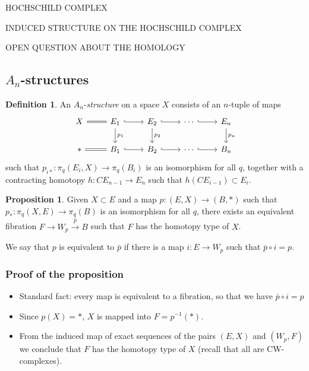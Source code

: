 \documentclass{beamer}
\theoremstyle{definition}
\newtheorem{defi}{Definition}
\newtheorem{prop}[teorema]{Proposition}
\begin{document}
\begin{frame}
HOCHSCHILD COMPLEX
	
\end{frame}

\begin{frame}
INDUCED STRUCTURE ON THE HOCHSCHILD COMPLEX
\end{frame}

\begin{frame}
OPEN QUESTION ABOUT THE HOMOLOGY
\end{frame}
\subsection{$A_n$-structures}
\begin{frame}[fragile]
\begin{defi}
An $A_n$-\emph{structure} on a space $X$ consists of an $n$-tuple of maps
\[
\begin{tikzcd}
X \arrow[r, equals] & E_1\arrow[r, hook]\arrow[d, "p_1"] & E_2\arrow[r, hook]\arrow[d, "p_2"] &\cdots\arrow[r, hook]& E_n\arrow[d, "p_n"] \\
*\arrow[r, equals] & B_1\arrow[r, hook] & 
B_2\arrow[r, hook]&\cdots\arrow[r, hook]& B_n
\end{tikzcd}
\]
such that $p_{i*}:\pi_q(E_i,X)\to \pi_q(B_i)$ is an isomorphism for all $q$, together with a contracting homotopy $h:CE_{n-1}\to E_n$ such that $h(CE_{i-1})\subset E_i$. %

\end{defi}
\end{frame}

\begin{frame}
\begin{prop}
Given $X\subset E$ and a map $p:(E,X)\to (B,*)$ such that $p_*:\pi_q(X,E)\to \pi_q(B)$ is an isomorphism for all $q$, there exists an equivalent fibration $F\to W_p\xrightarrow{\bar{p}} B$ such that $F$ has the homotopy type of $X$. 
\end{prop}\pause
We say that $p$ is equivalent to $\bar{p}$ if there is a map $i:E\to W_p$ such that $\bar{p}\circ i=p$.
 
\end{frame}
\begin{frame}
\frametitle{Proof of the proposition}
\begin{itemize}
\item<1-> Standard fact: every map is equivalent to a fibration, so that we have $\bar{p}\circ i=p$ %
\item<2-> Since $p(X)=*$, $X$ is mapped into $F=p^{-1}(*)$.
\item<3-> From the induced map of exact sequences of the pairs $(E,X)$ and $(W_p,F)$ we conclude that $F$ has the homotopy type of $X$ (recall that all are CW-complexes). 
\end{itemize}

\end{frame}
\end{document}

